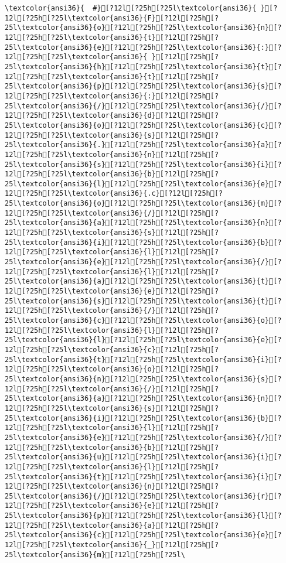 \documentclass{scrartcl}
\begin{document}
\begin{Verbatim}
\textcolor{ansi36}{  #}[?12l[?25h[?25l\textcolor{ansi36}{ }[?12l[?25h[?25l\textcolor{ansi36}{F}[?12l[?25h[?25l\textcolor{ansi36}{o}[?12l[?25h[?25l\textcolor{ansi36}{n}[?12l[?25h[?25l\textcolor{ansi36}{t}[?12l[?25h[?25l\textcolor{ansi36}{e}[?12l[?25h[?25l\textcolor{ansi36}{:}[?12l[?25h[?25l\textcolor{ansi36}{ }[?12l[?25h[?25l\textcolor{ansi36}{h}[?12l[?25h[?25l\textcolor{ansi36}{t}[?12l[?25h[?25l\textcolor{ansi36}{t}[?12l[?25h[?25l\textcolor{ansi36}{p}[?12l[?25h[?25l\textcolor{ansi36}{s}[?12l[?25h[?25l\textcolor{ansi36}{:}[?12l[?25h[?25l\textcolor{ansi36}{/}[?12l[?25h[?25l\textcolor{ansi36}{/}[?12l[?25h[?25l\textcolor{ansi36}{d}[?12l[?25h[?25l\textcolor{ansi36}{o}[?12l[?25h[?25l\textcolor{ansi36}{c}[?12l[?25h[?25l\textcolor{ansi36}{s}[?12l[?25h[?25l\textcolor{ansi36}{.}[?12l[?25h[?25l\textcolor{ansi36}{a}[?12l[?25h[?25l\textcolor{ansi36}{n}[?12l[?25h[?25l\textcolor{ansi36}{s}[?12l[?25h[?25l\textcolor{ansi36}{i}[?12l[?25h[?25l\textcolor{ansi36}{b}[?12l[?25h[?25l\textcolor{ansi36}{l}[?12l[?25h[?25l\textcolor{ansi36}{e}[?12l[?25h[?25l\textcolor{ansi36}{.c}[?12l[?25h[?25l\textcolor{ansi36}{o}[?12l[?25h[?25l\textcolor{ansi36}{m}[?12l[?25h[?25l\textcolor{ansi36}{/}[?12l[?25h[?25l\textcolor{ansi36}{a}[?12l[?25h[?25l\textcolor{ansi36}{n}[?12l[?25h[?25l\textcolor{ansi36}{s}[?12l[?25h[?25l\textcolor{ansi36}{i}[?12l[?25h[?25l\textcolor{ansi36}{b}[?12l[?25h[?25l\textcolor{ansi36}{l}[?12l[?25h[?25l\textcolor{ansi36}{e}[?12l[?25h[?25l\textcolor{ansi36}{/}[?12l[?25h[?25l\textcolor{ansi36}{l}[?12l[?25h[?25l\textcolor{ansi36}{a}[?12l[?25h[?25l\textcolor{ansi36}{t}[?12l[?25h[?25l\textcolor{ansi36}{e}[?12l[?25h[?25l\textcolor{ansi36}{s}[?12l[?25h[?25l\textcolor{ansi36}{t}[?12l[?25h[?25l\textcolor{ansi36}{/}[?12l[?25h[?25l\textcolor{ansi36}{c}[?12l[?25h[?25l\textcolor{ansi36}{o}[?12l[?25h[?25l\textcolor{ansi36}{l}[?12l[?25h[?25l\textcolor{ansi36}{l}[?12l[?25h[?25l\textcolor{ansi36}{e}[?12l[?25h[?25l\textcolor{ansi36}{c}[?12l[?25h[?25l\textcolor{ansi36}{t}[?12l[?25h[?25l\textcolor{ansi36}{i}[?12l[?25h[?25l\textcolor{ansi36}{o}[?12l[?25h[?25l\textcolor{ansi36}{n}[?12l[?25h[?25l\textcolor{ansi36}{s}[?12l[?25h[?25l\textcolor{ansi36}{/}[?12l[?25h[?25l\textcolor{ansi36}{a}[?12l[?25h[?25l\textcolor{ansi36}{n}[?12l[?25h[?25l\textcolor{ansi36}{s}[?12l[?25h[?25l\textcolor{ansi36}{i}[?12l[?25h[?25l\textcolor{ansi36}{b}[?12l[?25h[?25l\textcolor{ansi36}{l}[?12l[?25h[?25l\textcolor{ansi36}{e}[?12l[?25h[?25l\textcolor{ansi36}{/}[?12l[?25h[?25l\textcolor{ansi36}{b}[?12l[?25h[?25l\textcolor{ansi36}{u}[?12l[?25h[?25l\textcolor{ansi36}{i}[?12l[?25h[?25l\textcolor{ansi36}{l}[?12l[?25h[?25l\textcolor{ansi36}{t}[?12l[?25h[?25l\textcolor{ansi36}{i}[?12l[?25h[?25l\textcolor{ansi36}{n}[?12l[?25h[?25l\textcolor{ansi36}{/}[?12l[?25h[?25l\textcolor{ansi36}{r}[?12l[?25h[?25l\textcolor{ansi36}{e}[?12l[?25h[?25l\textcolor{ansi36}{p}[?12l[?25h[?25l\textcolor{ansi36}{l}[?12l[?25h[?25l\textcolor{ansi36}{a}[?12l[?25h[?25l\textcolor{ansi36}{c}[?12l[?25h[?25l\textcolor{ansi36}{e}[?12l[?25h[?25l\textcolor{ansi36}{_}[?12l[?25h[?25l\textcolor{ansi36}{m}[?12l[?25h[?25l\
\end{Verbatim}
\end{document}
